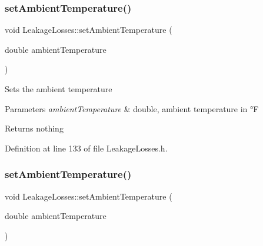 \mbox{\label{class_leakage_losses_aa6028111b3eb305d9ea6f9efea7c6c66}} 
\subsubsection{\texorpdfstring{set\+Ambient\+Temperature()}{setAmbientTemperature()}\hspace{0.1cm}{\footnotesize\ttfamily [2/3]}}
{\footnotesize\ttfamily void Leakage\+Losses\+::set\+Ambient\+Temperature (\begin{DoxyParamCaption}\item[{double}]{ambient\+Temperature }\end{DoxyParamCaption})\hspace{0.3cm}{\ttfamily [inline]}}

Sets the ambient temperature


\begin{DoxyParams}{Parameters}
{\em ambient\+Temperature} & double, ambient temperature in °F\\
\hline
\end{DoxyParams}
\begin{DoxyReturn}{Returns}
nothing 
\end{DoxyReturn}


Definition at line 133 of file Leakage\+Losses.\+h.

\mbox{\label{class_leakage_losses_aa6028111b3eb305d9ea6f9efea7c6c66}} 
\subsubsection{\texorpdfstring{set\+Ambient\+Temperature()}{setAmbientTemperature()}\hspace{0.1cm}{\footnotesize\ttfamily [3/3]}}
{\footnotesize\ttfamily void Leakage\+Losses\+::set\+Ambient\+Temperature (\begin{DoxyParamCaption}\item[{double}]{ambient\+Temperature }\end{DoxyParamCaption})\hspace{0.3cm}{\ttfamily [inline]}}

